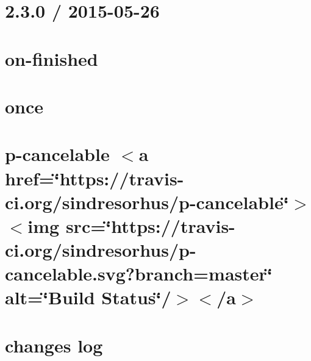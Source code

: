 \let\mypdfximage\pdfximage\def\pdfximage{\immediate\mypdfximage}\documentclass[twoside]{book}
\newcommand{\+}{\discretionary{\mbox{\scriptsize$\hookleftarrow$}}{}{}}
\begin{document}
\chapter{2.3.0 / 2015-\/05-\/26}
\label{md__c_1__git_hub__p_r_o_y_e_c_t_o-_i_i_i-_g_o_t_rest-api-node-mysql_node_modules_on-finished__h_i_s_t_o_r_y}

\chapter{on-\/finished}
\label{md__c_1__git_hub__p_r_o_y_e_c_t_o-_i_i_i-_g_o_t_rest-api-node-mysql_node_modules_on-finished__r_e_a_d_m_e}

\chapter{once}
\label{md__c_1__git_hub__p_r_o_y_e_c_t_o-_i_i_i-_g_o_t_rest-api-node-mysql_node_modules_once__r_e_a_d_m_e}

\chapter{p-\/cancelable $<$a href=\char`\"{}https\+://travis-\/ci.\+org/sindresorhus/p-\/cancelable\char`\"{}$>$$<$img src=\char`\"{}https\+://travis-\/ci.\+org/sindresorhus/p-\/cancelable.\+svg?branch=master\char`\"{} alt=\char`\"{}\+Build Status\char`\"{}/$>$$<$/a$>$}
\label{md__c_1__git_hub__p_r_o_y_e_c_t_o-_i_i_i-_g_o_t_rest-api-node-mysql_node_modules_p-cancelable_readme}

\chapter{changes log}
\label{md__c_1__git_hub__p_r_o_y_e_c_t_o-_i_i_i-_g_o_t_rest-api-node-mysql_node_modules_package-json_nocdfa3353e7cb470b4a21a64ffb6b92e5}

\end{document}

